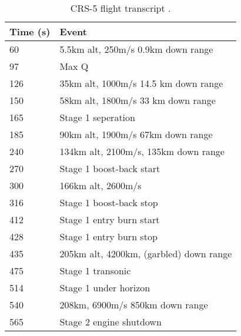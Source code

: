 \begin{table}[!htb]
\centering
\begin{tabular}{|l|l|}
\hline
\rowcolor[HTML]{C0C0C0} 
Time (s) & Event                                \\ \hline
60       & 5.5km alt, 250m/s 0.9km down range   \\ \hline
\rowcolor[HTML]{EFEFEF} 
97       & Max Q                                \\ \hline
126      & 35km alt, 1000m/s 14.5 km down range \\ \hline
\rowcolor[HTML]{EFEFEF} 
150      & 58km alt, 1800m/s 33 km down range   \\ \hline
165      & Stage 1 seperation                   \\ \hline
\rowcolor[HTML]{EFEFEF} 
185      & 90km alt, 1900m/s 67km down range    \\ \hline
240      & 134km alt, 2100m/s, 135km down range \\ \hline
\rowcolor[HTML]{EFEFEF} 
270      & Stage 1 boost-back start             \\ \hline
300      & 166km alt, 2600m/s                   \\ \hline
\rowcolor[HTML]{EFEFEF} 
316      & Stage 1 boost-back stop              \\ \hline
412      & Stage 1 entry burn start             \\ \hline
\rowcolor[HTML]{EFEFEF} 
428      & Stage 1 entry burn stop              \\ \hline
435      & 205km alt, 4200km, (garbled) down range    \\ \hline
\rowcolor[HTML]{EFEFEF} 
475      & Stage 1 transonic                    \\ \hline
514      & Stage 1 under horizon                \\ \hline
\rowcolor[HTML]{EFEFEF} 
540      & 208km, 6900m/s 850km down range      \\ \hline
565      & Stage 2 engine shutdown              \\ \hline
\end{tabular}
\caption{CRS-5 flight transcript \cite{CRS5}.}
\label{tab:CRS5}
\end{table}